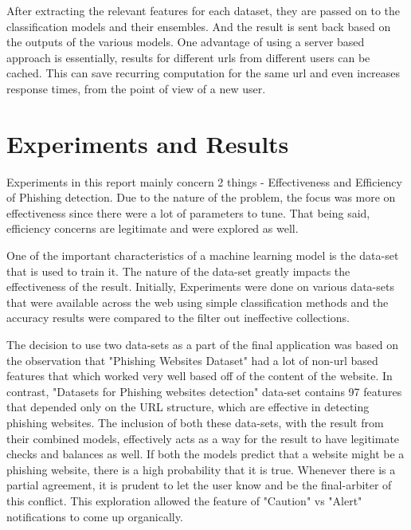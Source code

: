 \documentclass[conference]{IEEEtran}
\begin{document}
\par After extracting the relevant features for each dataset, they are passed on to the classification models and their ensembles.
And the result is sent back based on the outputs of the various models. 
One advantage of using a server based approach is essentially, results for different urls from different users can be cached. This can save recurring computation for the same url and even increases response times, from the point of view of a new user.


\section{Experiments and Results}

Experiments in this report mainly concern 2 things - Effectiveness and Efficiency of Phishing detection. Due to the nature of the problem, the focus was more on effectiveness since there were a lot of parameters to tune. That being said, efficiency concerns are legitimate and were explored as well.

\par One of the important characteristics of a machine learning model is the data-set that is used to train it. The nature of the data-set greatly impacts the effectiveness of the result. Initially, Experiments were done on various data-sets that were available across the web using simple classification methods and the accuracy results were compared to the filter out ineffective collections.

\par The decision to use two data-sets as a part of the final application was based on the observation that "Phishing Websites Dataset" had a lot of non-url based features that which worked very well based off of the content of the website. In contrast, "Datasets for Phishing websites detection" data-set contains 97 features that depended only on the URL structure, which are effective in detecting phishing websites. The inclusion of both these data-sets, with the result from their combined models, effectively acts as a way for the result to have legitimate checks and balances as well. If both the models predict that a website might be a phishing website, there is a high probability that it is true. Whenever there is a partial agreement, it is prudent to let the user know and be the final-arbiter of this conflict. This exploration allowed the feature of "Caution" vs "Alert" notifications to come up organically.
\end{document}

